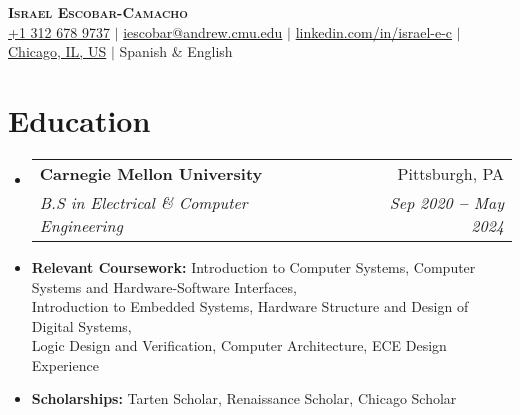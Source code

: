 \documentclass[letterpaper,11pt]{article}
\makeatletter
\newcommand{\resumeItem}[1]{
  \item\small{
    {#1 \vspace{-2pt}}
  }
}
\newcommand{\resumeEducationHeading}[6]{
  \vspace{-2pt}\item
    \begin{tabular*}{0.97\textwidth}[t]{l@{\extracolsep{\fill}}r}
      \textbf{#1} & #2 \\ %
      \textit{\small#3} & \textit{\small #4} \\ %
    \end{tabular*}\vspace{-5pt}
}
\newcommand{\resumeSubHeadingListStart}{\begin{itemize}[leftmargin=0.15in, label={}]}
\newcommand{\resumeSubHeadingListEnd}{\end{itemize}}
\newcommand{\resumeItemListStart}{\begin{itemize}}
\newcommand{\resumeItemListEnd}{\end{itemize}\vspace{-5pt}}
\makeatother
\begin{document}

\begin{center}
    \textbf{\Huge \scshape Israel Escobar-Camacho} \\ \vspace{3pt}
    \small
    \faMobile \hspace{.5pt} \href{tel:13126789737}{+1 312 678 9737}
    $|$
    \faAt \hspace{.5pt} \href{mailto:iescobar@andrew.cmu.edu}{iescobar@andrew.cmu.edu}
    $|$
    \faLinkedinSquare \hspace{.5pt} \href{https://www.linkedin.com/in/israel-e-c/}{linkedin.com/in/israel-e-c}
    $|$
    \faMapMarker \hspace{.5pt} \href{}{Chicago, IL, US}
    $|$
    \faLanguage \hspace{.5pt} {Spanish \& English}
\end{center}




\section{Education}
  \vspace{3pt}
  \resumeSubHeadingListStart

    \resumeEducationHeading
      {Carnegie Mellon University
      }{Pittsburgh, PA}
      {B.S in Electrical \& Computer Engineering}{Sep 2020 \textbf{--} May 2024}


  \resumeSubHeadingListEnd

  \resumeItemListStart
      \resumeItem{\textbf{Relevant Coursework:}{ Introduction to Computer Systems, Computer Systems and Hardware-Software Interfaces,\\ \hspace{111pt}
      Introduction to Embedded Systems,
      Hardware
      Structure and Design of Digital Systems,\\ \hspace{111pt}
      Logic Design and Verification,
      Computer Architecture, ECE Design Experience
      }}
      \resumeItem{\textbf{Scholarships:}{ Tarten Scholar, Renaissance Scholar, Chicago Scholar}}
      \vspace{3pt}
  \resumeItemListEnd
\end{document}

